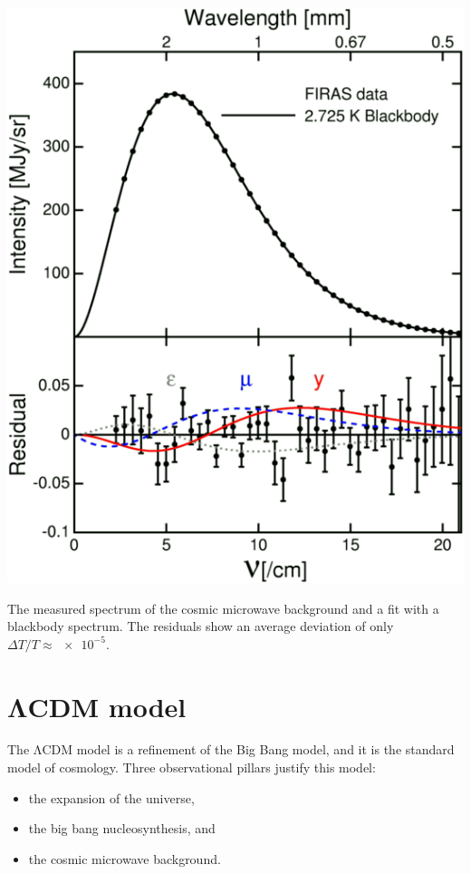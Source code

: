 \begin{marginfigure}
	\centering
	\includegraphics[width=\textwidth]{img/ch-02/cmb.png}
	\caption{The measured spectrum of the cosmic microwave background and a fit with a blackbody spectrum. The residuals show an average deviation of only $\Delta T / T \approx \num{e-5}$.}
	\label{fig:cmb}
\end{marginfigure}




\section{ΛCDM model}


The ΛCDM model is a refinement of the Big Bang model, and it is the standard model of cosmology. Three observational pillars justify this model:
\begin{itemize}
	\item the expansion of the universe,
	\item the big bang nucleosynthesis, and
	\item the cosmic microwave background.
\end{itemize}

